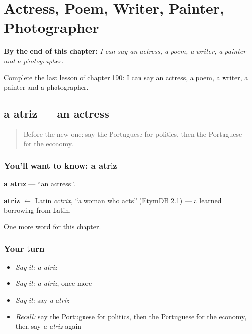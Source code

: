 
\chapter{Actress, Poem, Writer, Painter, Photographer}
\label{ch:pt-actress-poem-writer-painter-photographer}

\begin{chapteropening}
\textbf{By the end of this chapter:} \emph{I can say an actress, a poem, a writer, a painter and a photographer.}

Complete the last lesson of chapter 190: I can say an actress, a poem, a writer, a painter and a photographer.
\end{chapteropening}

\section[a atriz]{a atriz — an actress}

\label{lesson:PT-C190-atriz}



\begin{quote}
Before the new one: say the Portuguese for politics, then the Portuguese for the economy.
\end{quote}

\subsection*{You'll want to know: a atriz}
\textbf{a atriz} — \textquotedblleft{}an actress\textquotedblright{}.

\begin{cousinweb}
\textbf{atriz} $\leftarrow$ Latin \emph{actrix}, \textquotedblleft{}a woman who acts\textquotedblright{} (EtymDB 2.1) — a learned borrowing from Latin.
\end{cousinweb}

\begin{grammarlens}[title={What you've built}]
One more word for this chapter.
\end{grammarlens}

\subsection*{Your turn}
\begin{itemize}
\raggedright
  \item \emph{Say it:} \emph{a atriz}
  \item \emph{Say it:} \emph{a atriz}, once more
  \item \emph{Say it:} say \emph{a atriz}
  \item \emph{Recall:} say the Portuguese for politics, then the Portuguese for the economy, then say \emph{a atriz} again
\end{itemize}


